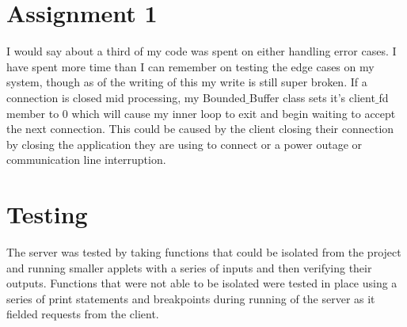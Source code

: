 \documentclass[11pt,letterpaper]{article}
\begin{document}
\section*{Assignment 1}
	I would say about a third of my code was spent on either handling error cases. I have spent more time than I can remember on testing the edge cases on my system, though as of the writing of this my write is still super broken.
	If a connection is closed mid processing, my Bounded$\_$Buffer class sets it's client$\_$fd member to 0 which will cause my inner loop to exit and begin waiting to accept the next connection. This could be caused by the client closing their connection by closing the application they are using to connect or a power outage or communication line interruption. 
\section*{Testing}
The server was tested by taking functions that could be isolated from the project and running smaller applets with a series of inputs and then verifying their outputs. Functions that were not able to be isolated were tested in place using a series of print statements and breakpoints during running of the server as it fielded requests from the client.
\end{document}
